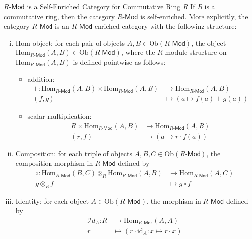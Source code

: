 \begin{proposition}{$R$-$\mathsf{Mod}$ is a Self-Enriched Category for Commutative Ring $R$}{}
    If $R$ is a commutative ring, then the category $R\text{-}\mathsf{Mod}$ is self-enriched. More explicitly, the category $R\text{-}\mathsf{Mod}$ is an $R\text{-}\mathsf{Mod}$-enriched category with the following structure:
    \begin{enumerate}[(i)]
        \item $\mathrm{Hom}$-object: for each pair of objects $A,B\in \mathrm{Ob}(R\text{-}\mathsf{Mod})$, the object $\mathrm{Hom}_{R\text{-}\mathsf{Mod}}(A,B)\in \mathrm{Ob}(R\text{-}\mathsf{Mod})$, where the $R$-module structure on $\mathrm{Hom}_{R\text{-}\mathsf{Mod}}(A,B)$ is defined pointwise as follows:
        \begin{itemize}
            \item addition: 
            \begin{align*}
                +:\mathrm{Hom}_{R\text{-}\mathsf{Mod}}(A,B)\times \mathrm{Hom}_{R\text{-}\mathsf{Mod}}(A,B)&\longrightarrow \mathrm{Hom}_{R\text{-}\mathsf{Mod}}(A,B)\\
                (f,g)&\longmapsto (a\mapsto f(a)+g(a))
            \end{align*}
            \item scalar multiplication: 
            \begin{align*}
                R\times \mathrm{Hom}_{R\text{-}\mathsf{Mod}}(A,B)&\longrightarrow \mathrm{Hom}_{R\text{-}\mathsf{Mod}}(A,B)\\
                (r,f)&\longmapsto (a\mapsto r\cdot f(a))
            \end{align*}
        \end{itemize}
       
        \item Composition: for each triple of objects $A,B,C\in \mathrm{Ob}(R\text{-}\mathsf{Mod})$, the composition morphism in $R\text{-}\mathsf{Mod}$ defined by
        \begin{align*}
            \circ:\mathrm{Hom}_{R\text{-}\mathsf{Mod}}(B,C)\otimes_R \mathrm{Hom}_{R\text{-}\mathsf{Mod}}(A,B)&\longrightarrow \mathrm{Hom}_{R\text{-}\mathsf{Mod}}(A,C)\\
            g\otimes_R f&\longmapsto g\circ f
        \end{align*}

        \item Identity: for each object $A\in \mathrm{Ob}(R\text{-}\mathsf{Mod})$, the morphism in $R\text{-}\mathsf{Mod}$ defined by
        \begin{align*}
            \mathcal{I}d_A:R&\longrightarrow \mathrm{Hom}_{R\text{-}\mathsf{Mod}}(A,A)\\
            r&\longmapsto \left(r\cdot \mathrm{id}_A:x\mapsto r\cdot x\right)
        \end{align*}
    \end{enumerate}
\end{proposition}
